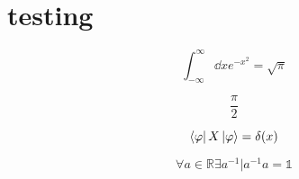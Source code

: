 


\section*{testing}


$$\int_{-\infty}^{\infty}\dd x e^{-x^2} = \sqrt{\pi}$$ 

$$\frac{\pi}{2} $$ 

$$\bra{ \varphi }X \ket{ \varphi } = \delta(x)$$ 

$$\forall a \in \mathbb{R} \exists a^{-1} | a^{-1}a = \mathds{1}$$ 




